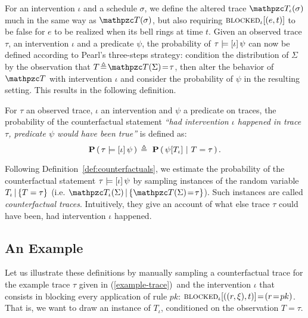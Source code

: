 
For an intervention $\iota$ and a schedule $\sigma$, we define the
altered trace $\DetTrace_\iota(\sigma)$ much in the same way as
$\DetTrace(\sigma)$, but also requiring ${\textsc{blocked}}_{\iota}[(e, t)]$ to
be false for $e$ to be realized when its bell rings at time $t$.
Given an observed trace $\tau$, an intervention $\iota$ and a
predicate $\psi$, the probability of $\tau \models [\iota] \, \psi{}$ can now be defined
according to Pearl's three-steps strategy: \ItAbduction{} condition
the distribution of $\Sigma$ by the observation that
$T \!\eqdef\! \DetTrace(\Sigma)\!=\!\tau$, then \ItAction{} alter the
behavior of $\DetTrace$ with intervention $\iota$ and \ItPrediction{}
consider the probability of $\psi$ in the resulting setting. This
results in the following definition.

\begin{definition}
  \label{def:counterfactuals}
  For $\tau$ an observed trace, $\iota$ an intervention and $\psi$ a
  predicate on traces, the probability of the counterfactual statement
  \textit{``had intervention $\iota$ happened in trace $\tau$,
    predicate $\psi$ would have been true''} is defined as:
  \[ \mathbf{P} \left(\, \tau \models [\iota] \, \psi{} \,\right){} \triangleq \ \mathbf{P} \left(\, \psi[{T_\iota}{}] \,\, | \,\, T =
      \tau \,\right). \]
\end{definition}

Following Definition~\ref{def:counterfactuals}, we estimate the
probability of the counterfactual statement $\tau \models [\iota] \, \psi{}$ by sampling
instances of the random variable ${T_\iota\,|\,\{T=\tau\}}{}$ (i.e.
$\DetTrace_\iota(\Sigma) \,|\, \{ \DetTrace(\Sigma) \!=\! \tau \}$).
Such instances are called \emph{counterfactual traces}. Intuitively,
they give an account of what else trace $\tau$ could have been, had
intervention $\iota$ happened.


\subsection{An Example}\label{subsec:counterfactuals-example}


\newcommand{\RTrace}{T} \newcommand{\ATrace}{T_\iota}

Let us illustrate these definitions by manually sampling a
counterfactual trace for the example trace $\tau$ given in
(\ref{example-trace})\, and the intervention $\iota$ that consists in
blocking every application of rule $pk$:
${\textsc{blocked}}_{\iota}[((r, \xi), t)] \!=\! (r \!=\! pk)$.
That is, we want to draw
an instance of $\ATrace$, conditioned on the observation
$\RTrace \!=\! \tau$.

